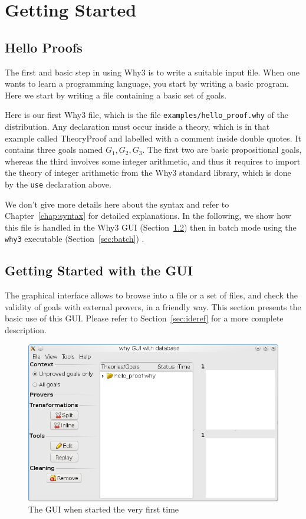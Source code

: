 \chapter{Getting Started}
\label{chap:starting}

\section{Hello Proofs}

The first and basic step in using Why3 is to write a suitable input
file. When one wants to learn a programming language, you start by
writing a basic program. Here we start by writing a file containing a
basic set of goals. 

Here is our first Why3 file, which is the file
\texttt{examples/hello\_proof.why} of the distribution.
 Any declaration must occur
inside a theory, which is in that example called TheoryProof and
labelled with a comment inside double quotes. It contains three goals
named $G_1,G_2,G_3$. The first two are basic propositional goals,
whereas the third involves some integer arithmetic, and thus it
requires to import the theory of integer arithmetic from the Why3
standard library, which is done by the \texttt{use} declaration above.

We don't give more details here about the syntax and refer to
Chapter~\ref{chap:syntax} for detailed explanations. In the following,
we show how this file is handled in the Why3 GUI
(Section~\ref{sec:gui}) then in batch mode using the \texttt{why3}
executable (Section~\ref{sec:batch}) .


\section{Getting Started with the GUI}
\label{sec:gui}

The graphical interface allows to browse into a file or a set of
files, and check the validity of goals with external provers, in a
friendly way. This section presents the basic use of this GUI. Please
refer to Section~\ref{sec:ideref} for a more complete description.

\begin{figure}[tbp]
  \includegraphics[width=\textwidth]{gui1.png}
  \caption{The GUI when started the very first time}
  \label{fig:gui1}
\end{figure}

